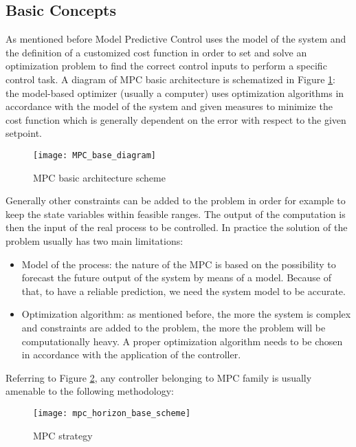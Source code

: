 \subsection{Basic Concepts}
As mentioned before Model Predictive Control uses the model of the system and the definition of a customized cost function in order to set and solve an optimization problem to find the correct control inputs to perform a specific control task.
A diagram of MPC basic architecture is schematized in Figure \ref{mpc_base_diagram}: the model-based optimizer (usually a computer) uses optimization algorithms in accordance with the model of the system and given measures to minimize the cost function which is generally dependent on the error with respect to the given setpoint.
\begin{figure}[h!]
	\centering
	\texttt{[image: MPC\_base\_diagram]}
	\caption{MPC basic architecture scheme}
	\label{mpc_base_diagram}
\end{figure}
Generally other constraints can be added to the problem in order for example to keep the state variables within feasible ranges. The output of the computation is then the input of the real process to be controlled. In  practice the solution of the problem usually has two main limitations:

\begin{itemize}
\item Model of the process: the nature of the MPC is based on the possibility to forecast the future output of the system by means of a model. Because of that, to have a reliable prediction, we need the system model to be accurate.

\item Optimization algorithm: as mentioned before, the more the system is complex and constraints are added to the problem, the more the problem will be computationally heavy. A proper optimization algorithm needs to be chosen in accordance with the application of the controller.
  
\end{itemize}
Referring to Figure \ref{mpc_horizon_base_scheme}, any controller belonging to MPC family is usually amenable to the following methodology:
\begin{figure}[h!]
	\centering
	\texttt{[image: mpc\_horizon\_base\_scheme]}
	\caption{MPC strategy}
	\label{mpc_horizon_base_scheme}
\end{figure}

